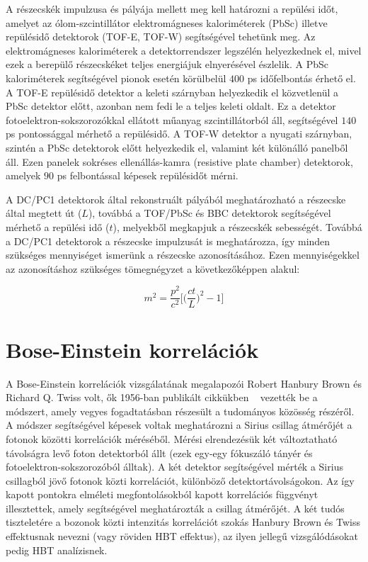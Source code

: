 \documentclass[11pt,a4paper]{article}
\numberwithin{equation}{subsection}
\numberwithin{figure}{section}
\begin{document}
A részecskék impulzusa és pályája mellett meg kell határozni a repülési időt, amelyet az  ólom-szcintillátor elektromágneses kaloriméterek (PbSc) illetve repülésidő detektorok (TOF-E, TOF-W) segítségével tehetünk meg. Az elektromágneses kaloriméterek a detektorrendszer legszélén helyezkednek el, mivel ezek a berepülő részecskéket teljes energiájuk elnyerésével észlelik. A PbSc kaloriméterek segítségével pionok esetén körülbelül $400$ ps időfelbontás érhető el. A TOF-E repülésidő detektor a keleti szárnyban helyezkedik el közvetlenül a PbSc detektor előtt, azonban nem fedi le a teljes keleti oldalt. Ez a detektor fotoelektron-sokszorozókkal ellátott műanyag szcintillátorból áll, segítségével $140$ ps pontossággal mérhető a repülésidő. A TOF-W detektor a nyugati szárnyban, szintén a PbSc detektorok előtt helyezkedik el, valamint két különálló panelből áll. Ezen panelek sokréses ellenállás-kamra (resistive plate chamber) detektorok, amelyek $90$ ps felbontással képesek repülésidőt mérni.


A DC/PC1 detektorok által rekonstruált pályából meghatározható a részecske által megtett út ($L$), továbbá a TOF/PbSc és BBC detektorok segítségével mérhető a repülési idő ($t$), melyekből megkapjuk a részecskék sebességét. Továbbá a DC/PC1 detektorok a részecske impulzusát is meghatározza, így minden szükséges mennyiséget ismerünk a részecske azonosításához. Ezen mennyiségekkel az azonosításhoz szükséges tömegnégyzet a következőképpen alakul:

\begin{equation}
m^2=\frac{p^2}{c^2}\Bigg[\bigg(\frac{ct}{L}\bigg)^2-1\Bigg]
\label{eq:m2}
\end{equation}

\section{Bose-Einstein korrelációk}

A Bose-Einstein korrelációk vizsgálatának megalapozói Robert Hanbury Brown és Richard Q. Twiss volt, ők 1956-ban publikált cikkükben ~\cite{HanburyBrown:1956bqd} vezették be a módszert, amely vegyes fogadtatásban részesült a tudományos közösség részéről. A módszer segítségével képesek voltak meghatározni a Sirius csillag átmérőjét a fotonok közötti korrelációk méréséből. Mérési elrendezésük két változtatható távolságra levő foton detektorból állt (ezek egy-egy fókuszáló tányér és fotoelektron-sokszorozóból álltak). A két detektor segítségével mérték a Sirius csillagból jövő fotonok közti korrelációt, különböző detektortávolságokon. Az így kapott pontokra elméleti megfontolásokból kapott korrelációs függvényt illesztettek, amely segítségével meghatározták a csillag átmérőjét. A két tudós tiszteletére a bozonok közti intenzitás korrelációt szokás Hanbury Brown és Twiss effektusnak nevezni (vagy röviden HBT effektus), az ilyen jellegű vizsgálódásokat pedig HBT analízisnek.
\end{document}
